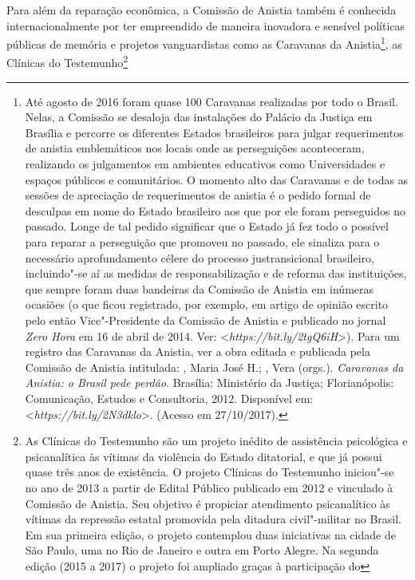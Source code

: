 Para além da reparação econômica, a Comissão de Anistia também é
conhecida internacionalmente por ter empreendido de maneira inovadora e
sensível políticas públicas de memória e projetos vanguardistas como as
Caravanas da Anistia\footnote{Até agosto de 2016 foram quase 100
  Caravanas realizadas por todo o Brasil. Nelas, a Comissão se desaloja
  das instalações do Palácio da Justiça em Brasília e percorre os
  diferentes Estados brasileiros para julgar requerimentos de anistia
  emblemáticos nos locais onde as perseguições aconteceram, realizando
  os julgamentos em ambientes educativos como Universidades e espaços
  públicos e comunitários. O momento alto das Caravanas e de todas as
  sessões de apreciação de requerimentos de anistia é o pedido formal de
  desculpas em nome do Estado brasileiro aos que por ele foram
  perseguidos no passado. Longe de tal pedido significar que o Estado já
  fez todo o possível para reparar a perseguição que promoveu no
  passado, ele sinaliza para o necessário aprofundamento célere do
  processo justransicional brasileiro, incluindo"-se aí as medidas de
  responsabilização e de reforma das instituições, que sempre foram duas
  bandeiras da Comissão de Anistia em inúmeras ocasiões (o que ficou
  registrado, por exemplo, em artigo de opinião escrito pelo então
  Vice"-Presidente da Comissão de Anistia e publicado no jornal \emph{Zero Hora}
  em 16 de abril de 2014. Ver:
  \textless{}\emph{https://bit.ly/2tgQ6iH}\textgreater{}). Para um registro das
  Caravanas da Anistia, ver a obra editada e publicada pela Comissão de
  Anistia intitulada: , Maria José H.; , Vera (orgs.).
  \emph{Caravanas da Anistia: o Brasil pede perdão}. Brasília:
  Ministério da Justiça; Florianópolis: Comunicação, Estudos e
  Consultoria, 2012. Disponível em:
  \textless{}\emph{https://bit.ly/2N3dklo}\textgreater{}.
  (Acesso em 27/10/2017).}, as Clínicas do Testemunho\footnote{As
  Clínicas do Testemunho são um projeto inédito de assistência
  psicológica e psicanalítica às vítimas da violência do Estado
  ditatorial, e que já possui quase três anos de existência. O projeto
  Clínicas do Testemunho iniciou"-se no ano de 2013 a partir de Edital
  Público publicado em 2012 e vinculado à Comissão de Anistia. Seu
  objetivo é propiciar atendimento psicanalítico às vítimas da repressão
  estatal promovida pela ditadura civil"-militar no Brasil. Em sua
  primeira edição, o projeto contemplou duas iniciativas na cidade de São
  Paulo, uma no Rio de Janeiro e outra em Porto Alegre. Na segunda
  edição (2015 a 2017) o projeto foi ampliado graças à participação do
}
